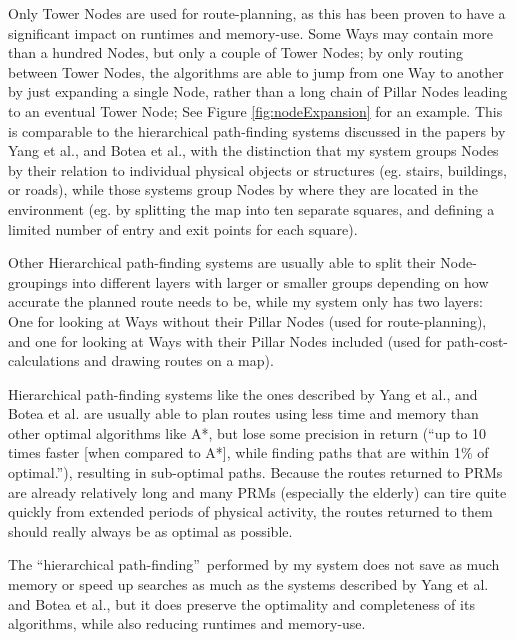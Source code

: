 Only Tower Nodes are used for route-planning, as this has been proven to have a significant impact on runtimes and memory-use\cite{CCAI07,botea-etal-jogd04}. Some Ways may contain more than a hundred Nodes, but only a couple of Tower Nodes; by only routing between Tower Nodes, the algorithms are able to jump from one Way to another by just expanding a single Node, rather than a long chain of Pillar Nodes leading to an eventual Tower Node; See Figure \ref{fig:nodeExpansion} for an example. This is comparable to the hierarchical path-finding systems discussed in the papers by Yang et al.\cite{CCAI07}, and Botea et al.\cite{botea-etal-jogd04}, with the distinction that my system groups Nodes by their relation to individual physical objects or structures (eg. stairs, buildings, or roads), while those systems group Nodes by where they are located in the environment (eg. by splitting the map into ten separate squares, and defining a limited number of entry and exit points for each square).

Other Hierarchical path-finding systems are usually able to split their Node-groupings into different layers with larger or smaller groups depending on how accurate the planned route needs to be, while my system only has two layers: One for looking at Ways without their Pillar Nodes (used for route-planning), and one for looking at Ways with their Pillar Nodes included (used for path-cost-calculations and drawing routes on a map). 

Hierarchical path-finding systems like the ones described by Yang et al.\cite{CCAI07}, and Botea et al.\cite{botea-etal-jogd04} are usually able to plan routes using less time and memory than other optimal algorithms like A*, but lose some precision in return (\textquotedblleft up to 10 times faster [when compared to A*], while finding paths that are within 1\% of optimal.\textquotedblright\cite[page. 1]{botea-etal-jogd04}), resulting in sub-optimal paths. Because the routes returned to PRMs are already relatively long and many PRMs (especially the elderly) can tire quite quickly from extended periods of physical activity, the routes returned to them should really always be as optimal as possible.

The \textquotedblleft hierarchical path-finding\textquotedblright~performed by my system does not save as much memory or speed up searches as much as the systems described by Yang et al.\cite{CCAI07} and Botea et al.\cite{botea-etal-jogd04}, but it does preserve the optimality and completeness of its algorithms, while also reducing runtimes and memory-use.

